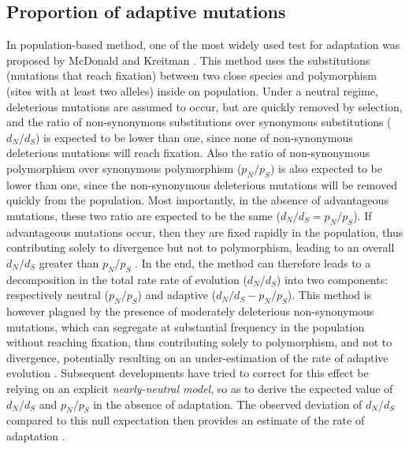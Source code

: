 \subsection{Proportion of adaptive mutations}
In population-based method, one of the most widely used test for adaptation was proposed by McDonald and Kreitman \citet{McDonald1991}. This method uses the substitutions (mutations that reach fixation) between two close species and polymorphism (sites with at least two alleles) inside on population. Under a neutral regime, deleterious mutations are assumed to occur, but are quickly removed by selection, and the ratio of non-synonymous substitutions over synonymous substitutions ($d_N/d_S$) is expected to be lower than one, since none of non-synonymous deleterious mutations will reach fixation. Also the ratio of non-synonymous polymorphism over synonymous polymorphism ($p_N/p_S$) is also expected to be lower than one, since the non-synonymous deleterious mutations will be removed quickly from the population. Most importantly, in the absence of advantageous mutations, these two ratio are expected to be the same ($d_N/d_S=p_N/p_S$). If advantageous mutations occur, then they are fixed rapidly in the population, thus contributing solely to divergence but not to polymorphism, leading to an overall $d_N/d_S$ greater than $p_N/p_S$ \citet{smith_adaptive_2002, kimura_neutral_1983}. In the end, the method can therefore leads to a decomposition in the total rate rate of evolution ($d_N/d_S$) into two components: respectively neutral ($p_N/p_S$) and adaptive ($d_N/d_S-p_N/p_S$). This method is however plagued by the presence of moderately deleterious non-synonymous mutations, which can segregate at substantial frequency in the population without reaching fixation, thus contributing solely to polymorphism, and not to divergence, potentially resulting on an under-estimation of the rate of adaptive evolution \citet{eyre-walker_quantifying_2002}. Subsequent developments have tried to correct for this effect be relying on an explicit \textit{nearly-neutral model}, so as to derive the expected value of $d_N/d_S$ and $p_N/p_S$ in the absence of adaptation. The observed deviation of $d_N/d_S$ compared to this null expectation then provides an estimate of the rate of adaptation \citet{eyre-walker_estimating_2009, galtier_adaptive_2016}.

